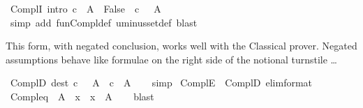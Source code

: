 \begin{isabellebody}
\endisatagproof
{\isafoldproof}%
%
\isadelimproof
\isanewline
%
\endisadelimproof
\isanewline
{}\isamarkupfalse%
\ ComplI\ {\isacharbrackleft}{\kern0pt}intro{\isacharbang}{\kern0pt}{\isacharbrackright}{\kern0pt}{\isacharcolon}{\kern0pt}\ {\isachardoublequoteopen}{\isacharparenleft}{\kern0pt}c\ {\isasymin}\ A\ {\isasymLongrightarrow}\ False{\isacharparenright}{\kern0pt}\ {\isasymLongrightarrow}\ c\ {\isasymin}\ {\isacharminus}{\kern0pt}\ A{\isachardoublequoteclose}\isanewline
%
\isadelimproof
\ \ %
\endisadelimproof
%
\isatagproof
{}\isamarkupfalse%
\ {\isacharparenleft}{\kern0pt}simp\ add{\isacharcolon}{\kern0pt}\ fun{\isacharunderscore}{\kern0pt}Compl{\isacharunderscore}{\kern0pt}def\ uminus{\isacharunderscore}{\kern0pt}set{\isacharunderscore}{\kern0pt}def{\isacharparenright}{\kern0pt}\ blast%
\endisatagproof
{\isafoldproof}%
%
\isadelimproof
%
\endisadelimproof
%
\begin{isamarkuptext}%
\medskip
  This form, with negated conclusion, works well with the Classical prover.
  Negated assumptions behave like formulae on the right side of the
  notional turnstile \dots%
\end{isamarkuptext}\isamarkuptrue%
\isamarkupfalse%
\ ComplD\ {\isacharbrackleft}{\kern0pt}dest{\isacharbang}{\kern0pt}{\isacharbrackright}{\kern0pt}{\isacharcolon}{\kern0pt}\ {\isachardoublequoteopen}c\ {\isasymin}\ {\isacharminus}{\kern0pt}\ A\ {\isasymLongrightarrow}\ c\ {\isasymnotin}\ A{\isachardoublequoteclose}\isanewline
%
\isadelimproof
\ \ %
\endisadelimproof
%
\isatagproof
{}\isamarkupfalse%
\ simp%
\endisatagproof
{\isafoldproof}%
%
\isadelimproof
\isanewline
%
\endisadelimproof
\isanewline
{}\isamarkupfalse%
\ ComplE\ {\isacharequal}{\kern0pt}\ ComplD\ {\isacharbrackleft}{\kern0pt}elim{\isacharunderscore}{\kern0pt}format{\isacharbrackright}{\kern0pt}\isanewline
\isanewline
{}\isamarkupfalse%
\ Compl{\isacharunderscore}{\kern0pt}eq{\isacharcolon}{\kern0pt}\ {\isachardoublequoteopen}{\isacharminus}{\kern0pt}\ A\ {\isacharequal}{\kern0pt}\ {\isacharbraceleft}{\kern0pt}x{\isachardot}{\kern0pt}\ {\isasymnot}\ x\ {\isasymin}\ A{\isacharbraceright}{\kern0pt}{\isachardoublequoteclose}\isanewline
%
\isadelimproof
\ \ %
\endisadelimproof
%
\isatagproof
{}\isamarkupfalse%
\ blast%
\endisatagproof
{\isafoldproof}%
%
\isadelimproof
%
\endisadelimproof
%
\isadelimdocument
%
\endisadelimdocument
%
\isatagdocument
%
\isamarkuptrue%
%
\endisatagdocument
{\isafolddocument}%

\end{isabellebody}
